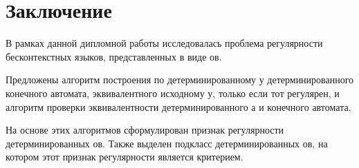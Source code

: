 \chapter{Заключение}						%
\label{chapt_conclusion}

В рамках данной дипломной работы исследовалась проблема регулярности бесконтекстных языков, представленных в виде \LGraph ов.

Предложены алгоритм построения по детерминированному \LGraph у детерминированного конечного автомата, эквивалентного исходному \LGraph у, только если тот регулярен, и алгоритм проверки эквивалентности детерминированного \LGraph а и конечного автомата.

На основе этих алгоритмов сформулирован признак регулярности детерминированных \LGraph ов. Также выделен подкласс детерминированных \LGraph ов, на котором этот признак регулярности является критерием.

\clearpage